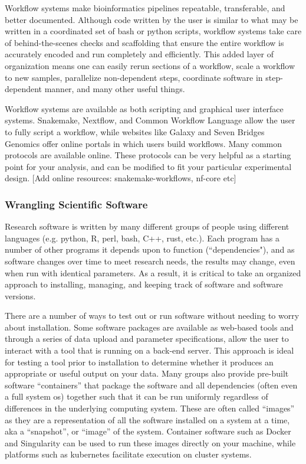 \documentclass[10pt,letterpaper]{article}
\begin{document}
Workflow systems make bioinformatics pipelines repeatable, transferable, and better documented. 
Although code written by the user is similar to what may be written in a coordinated set of bash or python scripts, workflow systems take care of behind-the-scenes checks and scaffolding that ensure the entire workflow is accurately encoded and run completely and efficiently. 
This added layer of organization means one can easily rerun sections of a workflow, scale a workflow to new samples, parallelize non-dependent steps, coordinate software in step-dependent manner, and many other useful things. 

Workflow systems are available as both scripting and graphical user interface systems. 
Snakemake, Nextflow, and Common Workflow Language allow the user to fully script a workflow, while websites like Galaxy and Seven Bridges Genomics offer online portals in which users build workflows. 
Many common protocols are available online. 
These protocols can be very helpful as a starting point for your analysis, and can be modified to fit your particular experimental design. 
[Add online resources: snakemake-workflows, nf-core etc] %


\subsubsection*{Wrangling Scientific Software} 
Research software is written by many different groups of people using different languages (e.g. python, R, perl, bash, C++, rust, etc.). 
Each program has a number of other programs it depends upon to function (``dependencies"), and as software changes over time to meet research needs, the results may change, even when run with identical parameters. 
As a result, it is critical to take an organized approach to installing, managing, and keeping track of software and software versions. 

There are a number of ways to test out or run software without needing to worry about installation. 
Some software packages are available as web-based tools and through a series of data upload and parameter specifications, allow the user to interact with a tool that is running on a back-end server. 
This approach is ideal for testing a tool prior to installation to determine whether it produces an appropriate or useful output on your data. 
Many groups also provide pre-built software “containers” that package the software and all dependencies (often even a full system os) together such that it can be run uniformly regardless of differences in the underlying computing system. 
These are often called “images” as they are a representation of all the software installed on a system at a time, aka a “snapshot”, or “image” of the system. 
Container software such as Docker and Singularity can be used to run these images directly on your machine, while platforms such as kubernetes facilitate execution on cluster systems.
\end{document}
